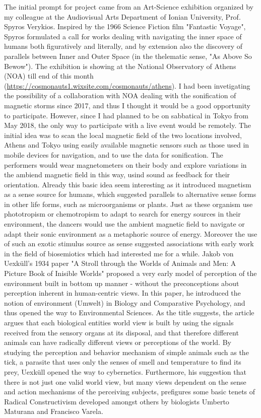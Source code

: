 \documentclass[11pt]{article}
\begin{document}
The initial prompt for project came from an Art-Science exhibition organized by my colleague at the Audiovisual Arts Department of Ionian University, Prof. Spyros Verykios.  Inspired by the 1966 Science Fiction film "Fantastic Voyage", Spyros formulated a call for works dealing with navigating the inner space of humans both figuratively and literally, and by extension also the discovery of parallels between Inner and Outer Space (in the thelematic sense, "As Above So Bewow").  The exhibition is showing at the National Observatory of Athens (NOA) till end of this month (\url{https://cosmonauts1.wixsite.com/cosmonauts/athens}).  I had been invetigating the possibility of a collaboration with NOA dealing with the sonification of magnetic storms since 2017, and thus I thought it would be a good opportunity to participate.  However, since I had planned to be on sabbatical in Tokyo from May 2018, the only way to participate with a live event would be remotely. The initial idea was to scan the local magnetic field of the two locations involved, Athens and Tokyo using easily available magnetic sensors such as those used in mobile devices for navigation, and to use the data for sonification.  The performers would wear magnetometers on their body and explore variations in the ambiend magnetic field in this way, usind sound as feedback for their orientation.  Already this basic idea seem interesting as it introduced magnetism as a sense source for humans, which suggested parallels to alternative sense forms in other life forms, such as microorganisms or plants.  Just as these organism use phototropism or chemotropism to adapt to search for energy sources in their environment, the dancers would use the ambient magnetic field to navigate or adapt their sonic environment as a metaphoric source of energy.  Moreover the use of such an exotic stimulus source as sense suggested associations with early work in the field of biosemiotics which had interested me for a while.  Jakob von Uexküll's 1934 paper "A Stroll through the Worlds of Animals and Men: A Picture Book of Inisible Worlds" proposed a very early model of perception of the environment built in bottom up manner - without the preconceptions about perception inherent in human-centric views. In this paper, he introduced the notion of environment (Umwelt) in Biology and Comparative Psychology, and thus opened the way to Environmental Sciences.  As the title suggests, the article argues that each biological entities world view is built by using the signals received from the sensory organs at its disposal, and that therefore different animals can have radically different views or perceptions of the world.  By studying the perception and behavior mechanism of simple animals such as the tick, a parasite that uses only the senses of smell and temperature to find its prey, Uexküll opened the way to cybernetics.  Furthermore, his suggestion that there is not just one valid world view, but many views dependent on the sense and action mechanisms of the perceiving subjects, prefigures some basic tenets of Radical Constructivism developed amongst others by biologists Umberto Maturana and Francisco Varela.  
\end{document}
